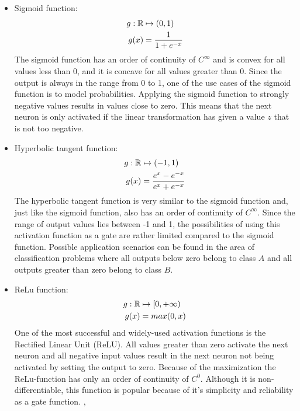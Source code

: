 \begin{itemize}
	\item Sigmoid function: 
		\begin{equation}
		\begin{split}
			g: \mathbb{R} 	& \mapsto (0,1) \\
			g(x) 	& = \frac{1}{1+e^{-x}} 
		\end{split}
		\end{equation}
		The sigmoid function has an order of continuity of $C^{\infty}$ and is convex for all values less than 0, and it is concave for all values greater than 0. Since the output is always in the range from 0 to 1, one of the use cases of the sigmoid function is to model probabilities. Applying the sigmoid function to strongly negative values results in values close to zero. This means that the next neuron is only activated if the linear transformation has given a value $z$ that is not too negative. 
	\item Hyperbolic tangent function: 
		\begin{equation}
		\begin{split}
			g: \mathbb{R} 	& \mapsto (-1,1) \\
			g(x) 	& = \frac{e^x - e^{-x}}{e^x + e^{-x}} 
		\end{split}
		\end{equation}
		The hyperbolic tangent function is very similar to the sigmoid function and, just like the sigmoid function, also has an order of continuity of $C^{\infty}$. Since the range of output values lies between -1 and 1, the possibilities of using this activation function as a gate are rather limited compared to the sigmoid function. Possible application scenarios can be found in the area of classification problems where all outputs below zero belong to class $A$ and all outputs greater than zero belong to class $B$. 
		
	\item ReLu function: 
		\begin{equation}
		\begin{split}
			g: \mathbb{R} 	& \mapsto [0,+ \infty) \\
			g(x) 	& = max(0,x) 
		\end{split}
		\end{equation}
		One of the most successful and widely-used activation functions is the Rectified Linear Unit (ReLU). All values greater than zero activate the next neuron and all negative input values result in the next neuron not being activated by setting the output to zero. Because of the maximization the ReLu-function has only an order of continuity of $C^0$. Although it is non-differentiable, this function is popular because of it's simplicity and reliability as a gate function. \cite{searchingActivation}, \cite{nair2010rectified}
			

\end{itemize}
